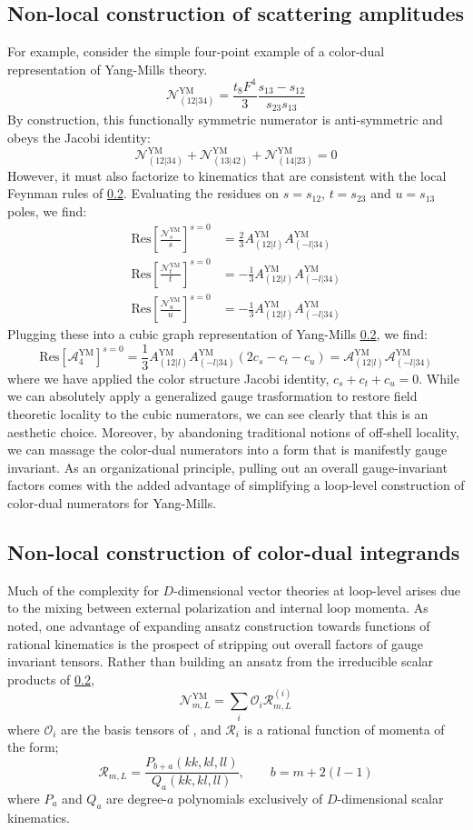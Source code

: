 \documentclass[11pt,letter]{article}
\def\be{\begin{equation}}
\def\ee{\end{equation}}
\begin{document}
\subsection{Non-local construction of scattering amplitudes}
 For example, consider the simple four-point example of a color-dual representation of Yang-Mills theory. 
\be
\mathcal{N}_{(12|34)}^{\text{YM}} = \frac{t_8F^4}{3} \frac{s_{13}-s_{12}}{s_{23}{s_{13}}}
\ee
By construction, this functionally symmetric numerator is anti-symmetric and obeys the Jacobi identity:
\be
\mathcal{N}_{(12|34)}^{\text{YM}} + \mathcal{N}_{(13|42)}^{\text{YM}} +\mathcal{N}_{(14|23)}^{\text{YM}} = 0
\ee
However, it must also factorize to kinematics that are consistent with the local Feynman rules of \ref{}. Evaluating the residues on $s=s_{12}$, $t=s_{23}$ and $u=s_{13}$ poles, we find:
\begin{align}
\text{Res}\left[\frac{ \mathcal{N}_{s}^{\text{YM}} }{s}\right]^{s=0}&= \frac{2}{3}A_{(12|l)}^{\text{YM}}A_{(-l|34)}^{\text{YM}} 
\\
\text{Res}\left[\frac{\mathcal{N}_{t}^{\text{YM}} }{t}\right]^{s=0}&= -\frac{1}{3}A_{(12|l)}^{\text{YM}}A_{(-l|34)}^{\text{YM}} 
\\
\text{Res}\left[\frac{\mathcal{N}_{u}^{\text{YM}} }{u}\right]^{s=0}&= -\frac{1}{3} A_{(12|l)}^{\text{YM}}A_{(-l|34)}^{\text{YM}} 
\end{align}
Plugging these into a cubic graph representation of Yang-Mills \ref{}, we find:
\be
\text{Res}\left[\mathcal{A}_4^{\text{YM}}\right]^{s=0} = \frac{1}{3} A_{(12|l)}^{\text{YM}}A_{(-l|34)}^{\text{YM}} (2c_s-c_t-c_u) =  \mathcal{A}_{(12|l)}^{\text{YM}}\mathcal{A}_{(-l|34)}^{\text{YM}} 
\ee
where we have applied the color structure Jacobi identity, $c_s+c_t+c_u=0$. While we can absolutely apply a generalized gauge trasformation \cite{BCJ} to restore field theoretic locality to the cubic numerators, we can see clearly that this is an aesthetic choice. Moreover, by abandoning traditional notions of off-shell locality, we can massage the color-dual numerators into a form that is manifestly gauge invariant. As an organizational principle, pulling out an overall gauge-invariant factors comes with the added advantage of simplifying a loop-level construction of color-dual numerators for Yang-Mills. 
\subsection{Non-local construction of color-dual integrands}
Much of the complexity for $D$-dimensional vector theories at loop-level arises due to the mixing between external polarization and internal loop momenta. As noted, one advantage of expanding ansatz construction towards functions of rational kinematics is the prospect of stripping out overall factors of gauge invariant tensors. Rather than building an ansatz from the irreducible scalar products of \ref{}, 
\be
\mathcal{N}^{\text{YM}}_{m,L} = \sum_i \mathcal{O}_i \mathcal{R}^{(i)}_{m,L}
\ee
where $\mathcal{O}_i$ are the basis tensors of \cite{}, and $ \mathcal{R}_i$ is a rational function of momenta of the form;
\be
\mathcal{R}_{m,L} = \frac{P_{b+a}(kk,kl,ll)}{Q_a(kk,kl,ll)}, \qquad b=m+2(l-1)
\ee
where $P_{a}$ and $Q_a$ are degree-$a$ polynomials exclusively of $D$-dimensional scalar kinematics. 
\end{document}
